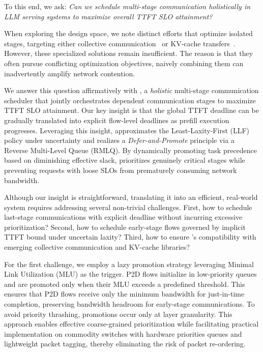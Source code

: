 To this end, we ask: \emph{Can we schedule multi-stage communication holistically in LLM serving systems to maximize overall TTFT SLO attainment?}

When exploring the design space, we note distinct efforts that optimize isolated stages, targeting either collective communication~\cite{rajasekaran2024cassini,cao2024crux,xu2025autoccl,cao2025syccl,si2025collective} or KV-cache transfers~\cite{strati2024d,cachegen,chen2024kvdirect,mooncakefast}. However, these specialized solutions remain insufficient. The reason is that they often pursue conflicting optimization objectives, naively combining them can inadvertently amplify network contention.

We answer this question affirmatively with \sys{}, a \emph{holistic} multi-stage communication scheduler that jointly orchestrates dependent communication stages to maximize TTFT SLO attainment. Our key insight is that the global TTFT deadline can be gradually translated into explicit flow-level deadlines as prefill execution progresses. Leveraging this insight, \sys{} approximates the Least-Laxity-First (LLF) policy under uncertainty and realizes a \emph{Defer-and-Promote} principle via a Reverse Multi-Level Queue (RMLQ). By dynamically promoting task precedence based on diminishing effective slack, \sys{} prioritizes genuinely critical stages while preventing requests with loose SLOs from prematurely consuming network bandwidth.

Although our insight is straightforward,
translating it into an efficient, real-world system requires addressing several non-trivial challenges. First, how to schedule last-stage communications with explicit deadline without incurring excessive prioritization? Second, how to schedule early-stage flows governed by implicit TTFT bound under uncertain laxity? Third, how to ensure \sys{}’s compatibility with emerging collective communication and KV-cache libraries?

For the first challenge, we employ a lazy promotion strategy leveraging Minimal Link Utilization (MLU) as the trigger. P2D flows initialize in low-priority queues and are promoted only when their MLU exceeds a predefined threshold. This ensures that P2D flows receive only the minimum bandwidth for just-in-time completion, preserving bandwidth headroom for early-stage communications. To avoid priority thrashing, promotions occur only at layer granularity. This approach enables effective coarse-grained  prioritization while facilitating  practical implementation on commodity switches with hardware priorities queues and lightweight packet tagging, thereby eliminating the risk of packet re-ordering.

